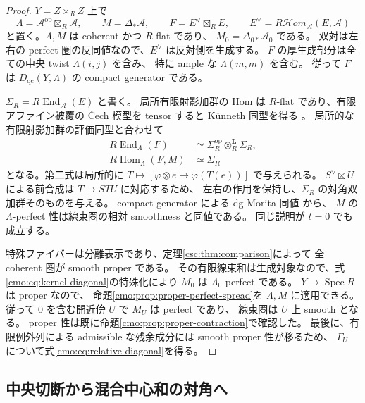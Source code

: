 \begin{proof}
$Y=Z\times_R Z$ 上で
\[
 \Lambda=\mathcal A^{\mathrm{op}}\boxtimes_R\mathcal A,
 \qquad M=\Delta_*\mathcal A,
 \qquad F=E^\vee\boxtimes_R E,
 \qquad E^\vee=R\mathcal Hom_{\mathcal A}(E,\mathcal A)
\]
と置く。$\Lambda,M$ は coherent かつ $R$-flat であり、
$M_0=\Delta_{0*}\mathcal A_0$ である。
双対は左右の perfect 圏の反同値なので、$E^\vee$ は反対側を生成する。
$F$ の厚生成部分は全ての中央 twist $\Lambda(i,j)$ を含み、
特に ample な $\Lambda(m,m)$ を含む。
従って $F$ は $D_{\mathrm{qc}}(Y,\Lambda)$ の compact generator である。

$\Sigma_R=R\operatorname{End}_{\mathcal A}(E)$ と書く。
局所有限射影加群の Hom は $R$-flat であり、有限アファイン被覆の
\v Cech 模型を tensor すると K\"unneth 同型を得る
\cite[Tag~0FU4]{CMOStacksDerived}。
局所的な有限射影加群の評価同型と合わせて
\begin{equation}\label{cmo:eq:kernel-diagonal}
 \begin{split}
 R\operatorname{End}_\Lambda(F)
      &\simeq\Sigma_R^{\mathrm{op}}\otimes_R^{\mathbf L}\Sigma_R,\\
 R\operatorname{Hom}_\Lambda(F,M)&\simeq\Sigma_R
 \end{split}
\end{equation}
となる。第二式は局所的に $T\mapsto[\varphi\otimes e\mapsto\varphi(T(e))]$ で与えられる。
$S^\vee\boxtimes U$ による前合成は $T\mapsto STU$ に対応するため、
左右の作用を保持し、$\Sigma_R$ の対角双加群そのものを与える。
compact generator による dg Morita 同値
\cite[Theorem~3.8(c)]{NFMKellerDg}から、
$M$ の $\Lambda$-perfect 性は線束圏の相対 smoothness と同値である。
同じ説明が $t=0$ でも成立する。

特殊ファイバーは分離表示であり、定理\ref{csc:thm:comparison}によって
全 coherent 圏が smooth proper である。
その有限線束和は生成対象なので、式\eqref{cmo:eq:kernel-diagonal}の特殊化により
$M_0$ は $\Lambda_0$-perfect である。
$Y\to\operatorname{Spec}R$ は proper なので、
命題\ref{cmo:prop:proper-perfect-spread}を $\Lambda,M$ に適用できる。
従って $0$ を含む開近傍 $U$ で $M_U$ は perfect であり、
線束圏は $U$ 上 smooth となる。
proper 性は既に命題\ref{cmo:prop:proper-contraction}で確認した。
最後に、有限例外列による admissible な残余成分には smooth proper 性が移るため、
$\Gamma_U$ について式\eqref{cmo:eq:relative-diagonal}を得る。
\end{proof}

\subsection{中央切断から混合中心和の対角へ}
\label{cmo:subsec:slice-mixed-diagonal}

